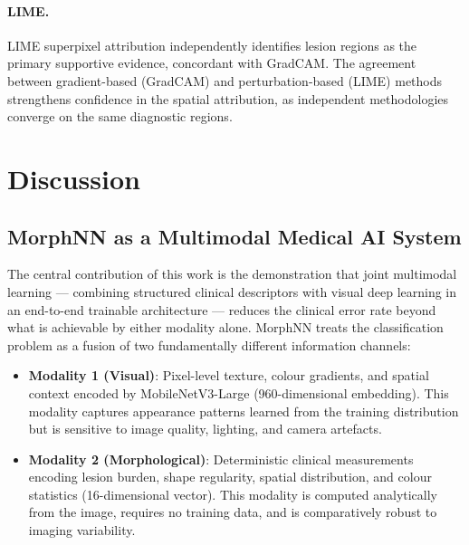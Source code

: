 \documentclass[preprint,12pt]{elsarticle}
\begin{document}
\paragraph{LIME.}
LIME superpixel attribution independently identifies lesion regions as
the primary supportive evidence, concordant with GradCAM.  The
agreement between gradient-based (GradCAM) and perturbation-based
(LIME) methods strengthens confidence in the spatial attribution, as
independent methodologies converge on the same diagnostic regions.


\section{Discussion}
\label{sec:discussion}

\subsection{MorphNN as a Multimodal Medical AI System}
\label{sec:discuss_multimodal}

The central contribution of this work is the demonstration that joint
multimodal learning --- combining structured clinical descriptors with
visual deep learning in an end-to-end trainable architecture --- reduces
the clinical error rate beyond what is achievable by either modality
alone.  MorphNN treats the classification problem as a fusion of two
fundamentally different information channels:

\begin{itemize}
  \item \textbf{Modality 1 (Visual)}: Pixel-level texture, colour
    gradients, and spatial context encoded by MobileNetV3-Large
    (960-dimensional embedding).  This modality captures appearance
    patterns learned from the training distribution but is sensitive
    to image quality, lighting, and camera artefacts.

  \item \textbf{Modality 2 (Morphological)}: Deterministic clinical
    measurements encoding lesion burden, shape regularity, spatial
    distribution, and colour statistics (16-dimensional vector).
    This modality is computed analytically from the image, requires
    no training data, and is comparatively robust to imaging variability.
\end{itemize}
\end{document}
